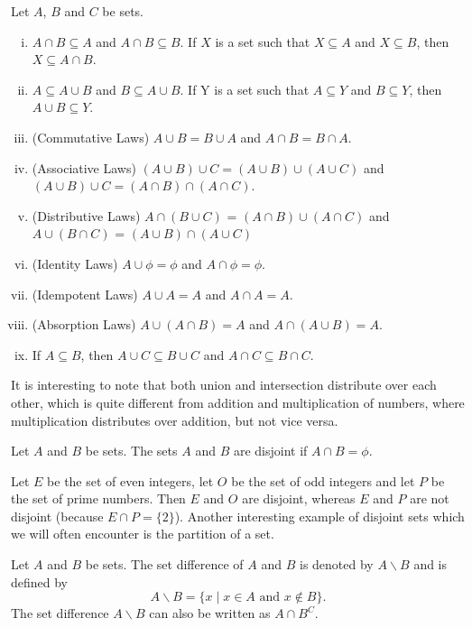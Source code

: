 \documentclass[a4paper,english,12pt]{article}
\begin{document}
\begin{thm}
 Let $A$, $B$ and $C$ be sets. 
\begin{enumerate} [i)]
\item $A \cap B \subseteq A$ and $A \cap B \subseteq B$. If $X$ is a set such that $X \subseteq A$ and $X \subseteq B$, then 
$X \subseteq A \cap B $.
\item $A \subseteq A \cup B $ and $B \subseteq A \cup B $. If Y is a set such that $A \subseteq Y$ and $B \subseteq Y$, then $A \cup B \subseteq Y$.
\item (Commutative Laws) $A \cup B = B \cup A$ and $A \cap B = B \cap A$.
\item (Associative Laws) $(A \cup B) \cup C = (A \cup B) \cup (A \cup C)$ and $(A \cup B) \cup C = (A \cap B) \cap (A \cap C)$. 
\item (Distributive Laws) $A \cap (B \cup C)$ = $(A \cap B) \cup (A \cap C)$ and $A \cup (B \cap C)$ = $(A \cup B) \cap (A \cup C)$
\item (Identity Laws) $A \cup \phi = \phi$ and $A \cap \phi = \phi$.
\item (Idempotent Laws) $A \cup A = A$ and $A \cap A = A$.
\item (Absorption Laws) $A \cup (A \cap B) = A$ and $A \cap (A \cup B) = A$.
\item If $A \subseteq B$, then $A \cup C \subseteq B \cup C$ and $A \cap C \subseteq B \cap C$.
\end{enumerate}
\end{thm}

It is interesting to note that both union and intersection distribute over each other, which is quite different from addition and multiplication of numbers,
where multiplication distributes over addition, but not vice versa.


\begin{defn}
 Let $A$ and $B$ be sets. The sets $A$ and $B$ are disjoint if $A \cap B = \phi$.
\end{defn}

\begin{exmp}
Let $E$ be the set of even integers, let $O$ be the set of odd integers and let $P$ be the set of prime numbers. Then $E$ and $O$ are disjoint, 
whereas $E$ and $P$ are not disjoint (because $E \cap P = \{2\}$). Another interesting example of disjoint sets which we will often encounter 
is the partition of a set.
\end{exmp}

\begin{defn}
Let $A$ and $B$ be sets. The set difference of $A$ and $B$ is denoted by $A \backslash B$ and is defined by 
 \begin{equation}
  A \backslash B = \{ x \; | \;  x \in A \text{ and } x \notin B  \}.
 \end{equation}
The set difference $A \backslash B$ can also be written as $A \cap B^{C}$.
\end{defn}
\end{document}
